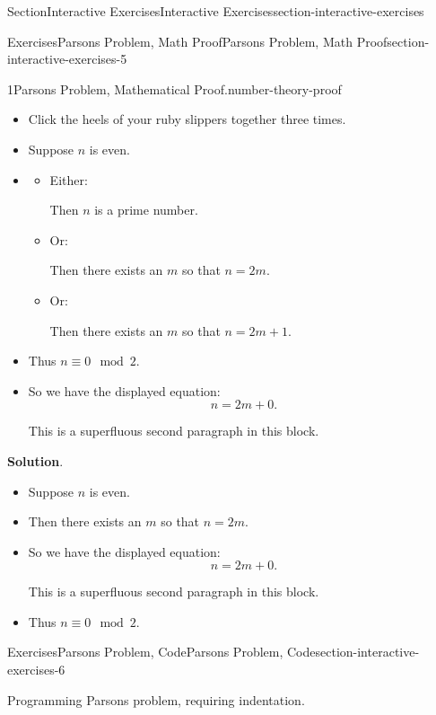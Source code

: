 \documentclass[twoside,10pt,]{article}
\newcommand{\blocktitlefont}{\relax}
\numberwithin{equation}{section}
\begin{document}
\begin{sectionptx}{Section}{Interactive Exercises}{}{Interactive Exercises}{}{}{section-interactive-exercises}
\begin{exercises-subsection}{Exercises}{Parsons Problem, Math Proof}{}{Parsons Problem, Math Proof}{}{}{section-interactive-exercises-5}
\begin{divisionexercise}{1}{Parsons Problem, Mathematical Proof.}{}{number-theory-proof}
\begin{itemize}[label=\textbullet]
\item{}Click the heels of your ruby slippers together three times.%
\item{}Suppose \(n\) is even.%
\item{}%
\begin{itemize}[label=]
\item{}Either:%
\par
Then \(n\) is a prime number.%
\item{}Or:%
\par
Then there exists an \(m\) so that \(n = 2m\).%
\item{}Or:%
\par
Then there exists an \(m\) so that \(n = 2m + 1\).%
\end{itemize}
%
\item{}Thus \(n\equiv 0\mod 2\).%
\item{}So we have the displayed equation:%
\begin{equation*}
n = 2m + 0\text{.}
\end{equation*}
%
\par
This is a superfluous second paragraph in this block.%
\end{itemize}
%
\par\smallskip%
\noindent\textbf{\blocktitlefont Solution}.\hypertarget{number-theory-proof-4}{}\quad{}%
\begin{itemize}[label=\textbullet]
\item{}Suppose \(n\) is even.%
\item{}Then there exists an \(m\) so that \(n = 2m\).%
\item{}So we have the displayed equation:%
\begin{equation*}
n = 2m + 0\text{.}
\end{equation*}
%
\par
This is a superfluous second paragraph in this block.%
\item{}Thus \(n\equiv 0\mod 2\).%
\end{itemize}
%
\end{divisionexercise}%
\end{exercises-subsection}
%
%
\typeout{************************************************}
\typeout{************************************************}
%
\begin{exercises-subsection}{Exercises}{Parsons Problem, Code}{}{Parsons Problem, Code}{}{}{section-interactive-exercises-6}
\begin{introduction}{}%
Programming Parsons problem, requiring indentation.%

\end{introduction}
\end{exercises-subsection}
\end{sectionptx}
\end{document}
